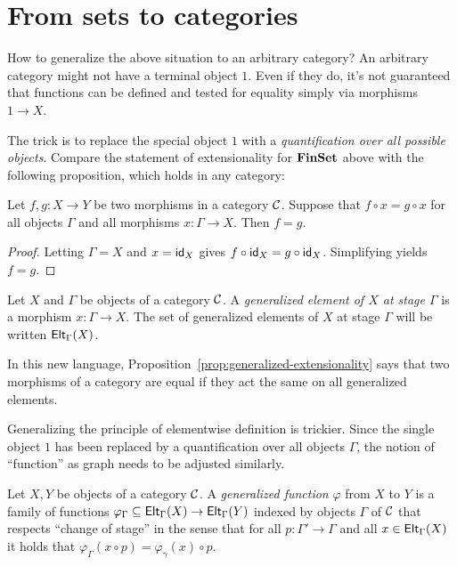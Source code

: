 \section{From sets to categories}

How to generalize the above situation to an arbitrary category?
An arbitrary category might not have a terminal object \(1\).
Even if they do, it's not guaranteed that functions can be
defined and tested for equality simply via morphisms \(1 \to X\).

The trick is to replace the special object \(1\)
with a \emph{quantification over all possible objects}.
Compare the statement of extensionality for \(\mathbf{FinSet}\)
above with the following proposition, which holds in any category:

\begin{proposition} \label{prop:generalized-extensionality}
  Let \(f,g : X \to Y\) be two morphisms in a category \(\mathcal C\).
  Suppose that \(f \circ x = g \circ x\) for all objects \(\Gamma\)
  and all morphisms \(x : \Gamma \to X\).
  Then \(f = g\).
\end{proposition}
\begin{proof}
  Letting \(\Gamma = X\) and \(x = \mathsf{id}_X\) gives \(f \circ \mathsf{id}_X = g \circ \mathsf{id}_X\).
  Simplifying yields \(f = g\).
\end{proof}

\begin{definition}
  Let \(X\) and \(\Gamma\) be objects of a category \(\mathcal C\).
  A \emph{generalized element of \(X\) at stage \(\Gamma\)}
  is a morphism \(x : \Gamma \to X\).
  The set of generalized elements of \(X\) at stage \(\Gamma\)
  will be written \(\mathsf{Elt}_{\Gamma}(X)\).
\end{definition}

In this new language, Proposition~\ref{prop:generalized-extensionality}
says that two morphisms of a category are equal if
they act the same on all generalized elements.

Generalizing the principle of elementwise definition
is trickier. Since the single object \(1\) has been replaced by a quantification over
all objects \(\Gamma\), the notion of ``function'' as graph
needs to be adjusted similarly.

\begin{definition}
  Let \(X,Y\) be objects of a category \(\mathcal C\).
  A \emph{generalized function} \(\varphi\) from \(X\) to \(Y\)
  is a family of functions
  \(\varphi_\Gamma \subseteq \mathsf{Elt}_{\Gamma}(X) \to \mathsf{Elt}_{\Gamma}(Y)\)
  indexed by objects \(\Gamma\) of \(\mathcal C\)
  that respects ``change of stage''
  in the sense that for all \(p : \Gamma' \to \Gamma\)
  and all \(x \in \mathsf{Elt}_{\Gamma}(X)\)
  it holds that \(\varphi_\Gamma(x\circ p) = \varphi_\gamma(x)\circ p\).
\end{definition}

